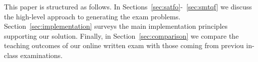 This paper is structured as follows. In Sections~\ref{sec:satfo}-~\ref{sec:smtqf}
we discuss the high-level approach to generating the exam
problems. Section~\ref{sec:implementation} surveys the main implementation principles supporting our
solution.
Finally, in Section~\ref{sec:comparison} we compare
the teaching outcomes of our online written exam with those coming
from previou in-class examinations. 
